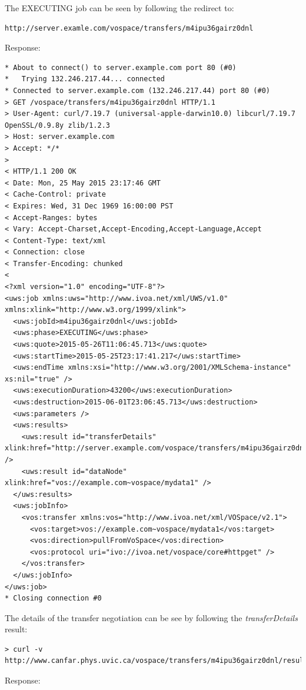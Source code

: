 \documentclass[11pt,a4paper]{ivoa}
\begin{document}
The EXECUTING job can be seen by following the redirect to:
\begin{lstlisting}
http://server.examle.com/vospace/transfers/m4ipu36gairz0dnl
\end{lstlisting}
Response:
\begin{lstlisting}
* About to connect() to server.example.com port 80 (#0)
*   Trying 132.246.217.44... connected
* Connected to server.example.com (132.246.217.44) port 80 (#0)
> GET /vospace/transfers/m4ipu36gairz0dnl HTTP/1.1
> User-Agent: curl/7.19.7 (universal-apple-darwin10.0) libcurl/7.19.7 OpenSSL/0.9.8y zlib/1.2.3
> Host: server.example.com
> Accept: */*
>
< HTTP/1.1 200 OK
< Date: Mon, 25 May 2015 23:17:46 GMT
< Cache-Control: private
< Expires: Wed, 31 Dec 1969 16:00:00 PST
< Accept-Ranges: bytes
< Vary: Accept-Charset,Accept-Encoding,Accept-Language,Accept
< Content-Type: text/xml
< Connection: close
< Transfer-Encoding: chunked
<
<?xml version="1.0" encoding="UTF-8"?>
<uws:job xmlns:uws="http://www.ivoa.net/xml/UWS/v1.0" xmlns:xlink="http://www.w3.org/1999/xlink">
  <uws:jobId>m4ipu36gairz0dnl</uws:jobId>
  <uws:phase>EXECUTING</uws:phase>
  <uws:quote>2015-05-26T11:06:45.713</uws:quote>
  <uws:startTime>2015-05-25T23:17:41.217</uws:startTime>
  <uws:endTime xmlns:xsi="http://www.w3.org/2001/XMLSchema-instance" xs:nil="true" />
  <uws:executionDuration>43200</uws:executionDuration>
  <uws:destruction>2015-06-01T23:06:45.713</uws:destruction>
  <uws:parameters />
  <uws:results>
    <uws:result id="transferDetails" xlink:href="http://server.example.com/vospace/transfers/m4ipu36gairz0dnl/results/transferDetails" />
    <uws:result id="dataNode" xlink:href="vos://example.com~vospace/mydata1" />
  </uws:results>
  <uws:jobInfo>
    <vos:transfer xmlns:vos="http://www.ivoa.net/xml/VOSpace/v2.1">
      <vos:target>vos://example.com~vospace/mydata1</vos:target>
      <vos:direction>pullFromVoSpace</vos:direction>
      <vos:protocol uri="ivo://ivoa.net/vospace/core#httpget" />
    </vos:transfer>
  </uws:jobInfo>
</uws:job>
* Closing connection #0
\end{lstlisting}
The details of the transfer negotiation can be see by following the \emph{transferDetails} result:
\begin{lstlisting}
> curl -v http://www.canfar.phys.uvic.ca/vospace/transfers/m4ipu36gairz0dnl/results/transferDetails
\end{lstlisting}
Response:
\end{document}
